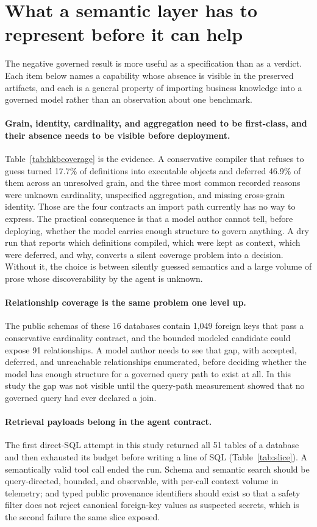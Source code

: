 \section{What a semantic layer has to represent before it can help}
\label{sec:product}

The negative governed result is more useful as a specification than as a verdict.
Each item below names a capability whose absence is visible in the preserved
artifacts, and each is a general property of importing business knowledge into a
governed model rather than an observation about one benchmark.

\paragraph{Grain, identity, cardinality, and aggregation need to be first-class,
and their absence needs to be visible before deployment.}
Table~\ref{tab:hkbcoverage} is the evidence. A conservative compiler that refuses to
guess turned 17.7\% of definitions into executable objects and deferred 46.9\% of
them across an unresolved grain, and the three most common recorded reasons were
unknown cardinality, unspecified aggregation, and missing cross-grain identity.
Those are the four contracts an import path currently has no way to express. The
practical consequence is that a model author cannot tell, before deploying,
whether the model carries enough structure to govern anything. A dry run that
reports which definitions compiled, which were kept as context, which were
deferred, and why, converts a silent coverage problem into a decision. Without
it, the choice is between silently guessed semantics and a large volume of prose
whose discoverability by the agent is unknown.

\paragraph{Relationship coverage is the same problem one level up.}
The public schemas of these 16 databases contain 1,049 foreign keys that pass a
conservative cardinality contract, and the bounded modeled candidate could expose
91 relationships. A model author needs to see that gap, with accepted, deferred,
and unreachable relationships enumerated, before deciding whether the model has
enough structure for a governed query path to exist at all. In this study the gap
was not visible until the query-path measurement showed that no governed query
had ever declared a join.

\paragraph{Retrieval payloads belong in the agent contract.}
The first direct-SQL attempt in this study returned all 51 tables of a database
and then exhausted its budget before writing a line of SQL
(Table~\ref{tab:slice}). A semantically valid tool call ended the run. Schema and
semantic search should be query-directed, bounded, and observable, with per-call
context volume in telemetry; and typed public provenance identifiers should exist
so that a safety filter does not reject canonical foreign-key values as
suspected secrets, which is the second failure the same slice exposed.

